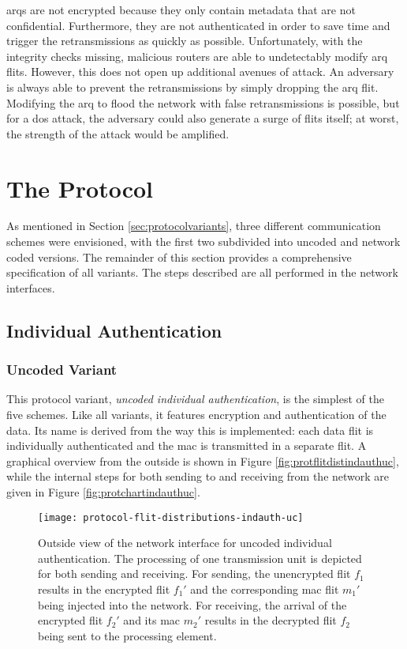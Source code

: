 
\Glspl{arq} are not encrypted because they only contain metadata that are not confidential. Furthermore, they are not authenticated in order to save
time and trigger the retransmissions as quickly as possible. Unfortunately, with the integrity checks missing, malicious routers are able to undetectably
modify \gls{arq} flits. However, this does not open up additional avenues of attack. An adversary is always able to prevent the retransmissions
by simply dropping the \gls{arq} flit. Modifying the \gls{arq} to flood the network with false retransmissions is possible, but for a \gls{dos}
attack, the adversary could also generate a surge of flits itself; at worst, the strength of the attack would be amplified.

\section{The Protocol}\label{sec:theprotocol}
As mentioned in Section \ref{sec:protocolvariants}, three different communication schemes were envisioned, with the first two subdivided into uncoded
and network coded versions. The remainder of this section provides a comprehensive specification of all variants. The steps described are all
performed in the network interfaces.

\subsection{Individual Authentication}\label{subsec:indauth}
\subsubsection{Uncoded Variant}
This protocol variant, \textit{uncoded individual authentication}, is the simplest of the five schemes. Like all variants, it features encryption and
authentication of the data. Its name is derived from the way this is implemented: each data flit is individually authenticated and the \gls{mac} is
transmitted in a separate flit. A graphical overview from the outside is shown in Figure \vref{fig:protflitdistindauthuc}, while the internal steps for
both sending to and receiving from the network are given in Figure \vref{fig:protchartindauthuc}.

\begin{figure}
    \centering
    \texttt{[image: protocol-flit-distributions-indauth-uc]}
    \caption[Uncoded ind. auth., outside view]{Outside view of the network interface for uncoded individual authentication. The processing of one
    transmission unit is depicted for both sending and receiving. For sending, the unencrypted flit $f_1$ results in the encrypted flit $f_1'$ and the
    corresponding \gls{mac} flit $m_1'$ being injected into the network. For receiving, the arrival of the encrypted flit $f_2'$ and its \gls{mac}
    $m_2'$ results in the decrypted flit $f_2$ being sent to the processing element.}
    \label{fig:protflitdistindauthuc}
\end{figure}

